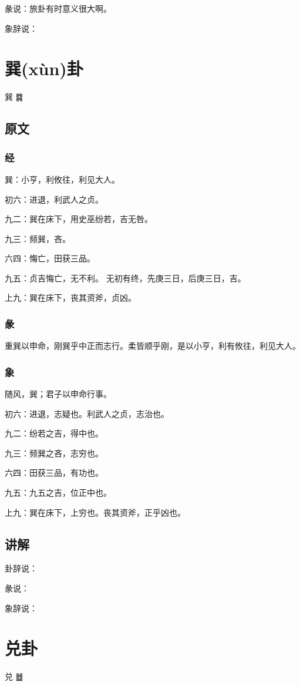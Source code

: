 \documentclass[12pt,oneside]{book}
\begin{document}
彖说：旅卦有时意义很大啊。

象辞说：

\chapter{巽(xùn)卦}
巽 {\Large ䷸}

\section{原文}

\subsection{经}
巽：小亨，利攸往，利见大人。

初六：进退，利武人之贞。

九二：巽在床下，用史巫纷若，吉无咎。

九三：频巽，吝。

六四：悔亡，田获三品。

九五：贞吉悔亡，无不利。 无初有终，先庚三日，后庚三日，吉。

上九：巽在床下，丧其资斧，贞凶。

\subsection{彖}
重巽以申命，刚巽乎中正而志行。柔皆顺乎刚，是以小亨，利有攸往，利见大人。

\subsection{象}
随风，巽；君子以申命行事。

初六：进退，志疑也。利武人之贞，志治也。

九二：纷若之吉，得中也。

九三：频巽之吝，志穷也。

六四：田获三品，有功也。

九五：九五之吉，位正中也。

上九：巽在床下，上穷也。丧其资斧，正乎凶也。

\section{讲解}
卦辞说：

彖说：

象辞说：


\chapter{兑卦}
兑 {\Large ䷹}
\end{document}
